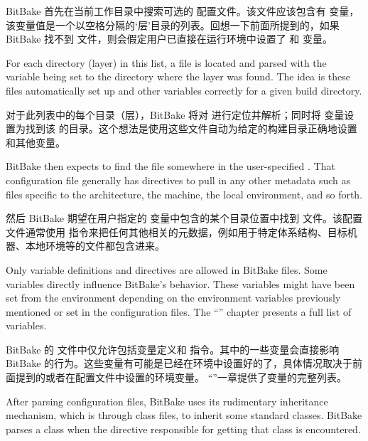 BitBake 首先在当前工作目录中搜索可选的  配置文件。该文件应该包含有  变量，该变量值是一个以空格分隔的`层'目录的列表。回想一下前面所提到的，如果 BitBake 找不到  文件，则会假定用户已直接在运行环境中设置了  和 变量。

For each directory (layer) in this list, a  file is located and parsed with the  variable being set to the directory where the layer was found. The idea is these files automatically set up  and other variables correctly for a given build directory.

对于此列表中的每个目录（层），BitBake 将对  进行定位并解析；同时将  变量设置为找到该 的目录。这个想法是使用这些文件自动为给定的构建目录正确地设置  和其他变量。

BitBake then expects to find the  file somewhere in the user-specified . That configuration file generally has  directives to pull in any other metadata such as files specific to the architecture, the machine, the local environment, and so forth.

然后 BitBake 期望在用户指定的  变量中包含的某个目录位置中找到  文件。该配置文件通常使用  指令来把任何其他相关的元数据，例如用于特定体系结构、目标机器、本地环境等的文件都包含进来。

Only variable definitions and  directives are allowed in BitBake  files. Some variables directly influence BitBake's behavior. These variables might have been set from the environment depending on the environment variables previously mentioned or set in the configuration files. The ``'' chapter presents a full list of variables.

BitBake 的  文件中仅允许包括变量定义和  指令。其中的一些变量会直接影响 BitBake 的行为。这些变量有可能是已经在环境中设置好的了，具体情况取决于前面提到的或者在配置文件中设置的环境变量。 ``''一章提供了变量的完整列表。


After parsing configuration files, BitBake uses its rudimentary inheritance mechanism, which is through class files, to inherit some standard classes. BitBake parses a class when the  directive responsible for getting that class is encountered.


